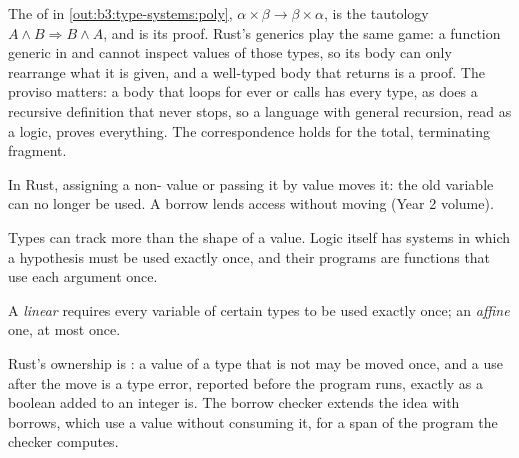 The  of  in \cref{out:b3:type-systems:poly}, $\alpha \times \beta \to \beta \times \alpha$, is the tautology $A \wedge B \Rightarrow B \wedge A$, and  is its proof. Rust's generics play the same game: a function generic in  and  cannot inspect values of those types, so its body can only rearrange what it is given, and a well-typed body that returns is a proof. The proviso matters: a body that loops for ever or calls  has every type, as does a recursive definition that never stops, so a language with general recursion, read as a logic, proves everything. The correspondence holds for the total, terminating fragment.

\label{lst:b3:type-systems:ch}

\label{out:b3:type-systems:ch}

\begin{recall}
In Rust, assigning a non- value or passing it by value moves it: the old variable can no longer be used. A borrow lends access without moving (Year 2 volume).
\end{recall}

Types can track more than the shape of a value. Logic itself has systems in which a hypothesis must be used exactly once, and their programs are functions that use each argument once.

\begin{definition}\label{def:b3:type-systems:linear}
A \emph{linear}  requires every variable of certain types to be used exactly once; an \emph{affine} one, at most once.
\end{definition}

Rust's ownership is : a value of a type that is not  may be moved once, and a use after the move is a type error, reported before the program runs, exactly as a boolean added to an integer is. The borrow checker extends the idea with borrows, which use a value without consuming it, for a span of the program the checker computes.

